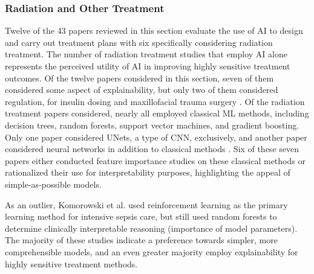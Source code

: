 \documentclass[authoryear,preprint,12pt]{elsarticle}
\begin{document}
\subsubsection{Radiation and Other Treatment}
Twelve \cite{nimriInsulinDoseOptimization2020,komorowskiArtificialIntelligenceClinician2018,bittermanDosimetricPlanningTradeoffs2022,chenEvaluationAutomatedClinical2024,alizade-harakiyanDecisionTreebasedMachine2025,fleuryStereotacticRadiationTherapy2025,sakuragiInterpretableMachineLearningbased2024,chamseddinePredictiveModelingSurvival2022,braunMachineLearninggeneratedDecision2022, allenUseClinicalPathway2022,cutforthAcuteStrokeCDS2023, shhadehContributionRealtimeArtificial2025} of the 43 papers reviewed in
this section evaluate the use of AI to design and carry out treatment plans with
six specifically considering radiation treatment. The number of radiation
treatment studies that employ AI alone represents the perceived utility of AI in
improving highly sensitive treatment outcomes. Of the twelve papers considered
in this section, seven of them considered some aspect of explainability, but
only two of them considered regulation, for insulin dosing and
\cite{nimriInsulinDoseOptimization2020} maxillofacial trauma surgery
\cite{shhadehContributionRealtimeArtificial2025}. Of the radiation treatment
papers considered, nearly all employed classical ML methods, including decision
trees, random forests, support vector machines, and gradient boosting. Only one
paper \cite{chenEvaluationAutomatedClinical2024} considered UNets, a type of
CNN, exclusively, and another paper considered neural networks in addition to
classical methods \cite{chamseddinePredictiveModelingSurvival2022}. Six
\cite{alizade-harakiyanDecisionTreebasedMachine2025,fleuryStereotacticRadiationTherapy2025,chamseddinePredictiveModelingSurvival2022,braunMachineLearninggeneratedDecision2022, allenUseClinicalPathway2022,sakuragiInterpretableMachineLearningbased2024} of these seven papers
either conducted feature importance studies on these classical methods or
rationalized their use for interpretability purposes, highlighting the appeal of
simple-as-possible models. 

As an outlier, Komorowski et al.
\cite{komorowskiArtificialIntelligenceClinician2018} used reinforcement learning
as the primary learning method for intensive sepsis care, but still used random
forests to determine clinically interpretable reasoning (importance of model
parameters). The majority of these studies indicate a preference towards
simpler, more comprehensible models, and an even greater majority employ
explainability for highly sensitive treatment methods.
\end{document}
